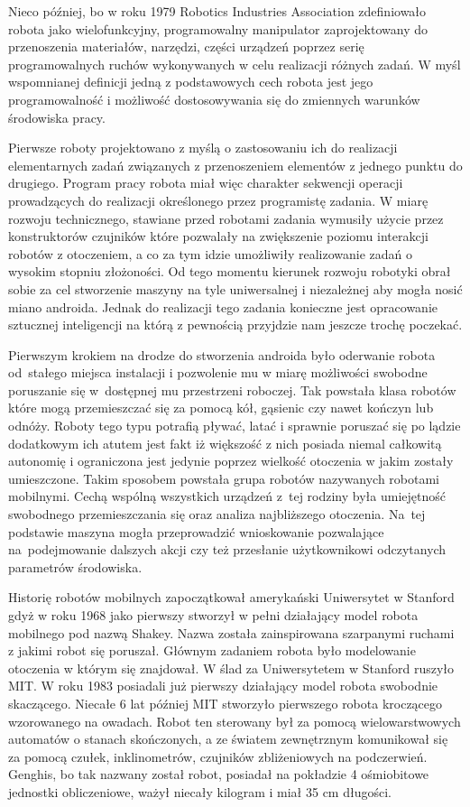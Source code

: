 Nieco później, bo w roku 1979 Robotics Industries Association 
zdefiniowało robota jako wielofunkcyjny, programowalny manipulator
zaprojektowany do przenoszenia materiałów, narzędzi, części urządzeń poprzez
serię programowalnych ruchów wykonywanych w celu realizacji różnych zadań.
W myśl wspomnianej definicji jedną z podstawowych cech robota jest jego
programowalność i możliwość dostosowywania się do zmiennych warunków środowiska
pracy. 

Pierwsze roboty projektowano z myślą o zastosowaniu ich do realizacji
elementarnych zadań związanych z przenoszeniem elementów z jednego punktu do
drugiego. Program pracy robota miał więc charakter sekwencji operacji
prowadzących do realizacji określonego przez programistę zadania. W miarę
rozwoju technicznego, stawiane przed robotami zadania wymusiły użycie przez
konstruktorów czujników które pozwalały na zwiększenie poziomu interakcji
robotów z otoczeniem, a co za tym idzie umożliwiły realizowanie zadań o wysokim
stopniu złożoności. Od tego momentu kierunek rozwoju robotyki obrał
sobie za cel stworzenie maszyny na tyle uniwersalnej i niezależnej aby mogła
nosić miano androida. Jednak do realizacji tego zadania konieczne jest
opracowanie sztucznej inteligencji na którą z pewnością przyjdzie nam jeszcze
trochę poczekać. 

Pierwszym krokiem na drodze do stworzenia androida było oderwanie robota
od~stałego miejsca instalacji i pozwolenie mu w miarę możliwości swobodne
poruszanie się w~dostępnej mu przestrzeni roboczej. Tak powstała klasa robotów
które mogą przemieszczać się za pomocą kół, gąsienic czy nawet kończyn lub
odnóży. Roboty tego typu potrafią pływać, latać i sprawnie poruszać się po lądzie
dodatkowym ich atutem jest fakt iż większość z nich posiada niemal całkowitą
autonomię i ograniczona jest jedynie poprzez wielkość otoczenia w jakim zostały
umieszczone. Takim sposobem powstała grupa robotów nazywanych robotami mobilnymi.
Cechą wspólną wszystkich urządzeń z~tej rodziny była umiejętność swobodnego
przemieszczania się oraz analiza najbliższego otoczenia. Na~tej podstawie maszyna
mogła przeprowadzić wnioskowanie pozwalające na~podejmowanie dalszych akcji czy
też przesłanie użytkownikowi odczytanych parametrów środowiska.

Historię robotów mobilnych zapoczątkował amerykański Uniwersytet w Stanford gdyż
w roku 1968 jako pierwszy stworzył w pełni działający model robota mobilnego pod
nazwą Shakey. Nazwa została zainspirowana szarpanymi ruchami z jakimi robot się
poruszał. Głównym zadaniem robota było modelowanie otoczenia w którym się
znajdował. W ślad za Uniwersytetem w Stanford ruszyło MIT. W roku 1983 posiadali
już pierwszy działający model robota swobodnie skaczącego. Niecałe 6
lat później MIT stworzyło pierwszego robota kroczącego wzorowanego na owadach.
Robot ten sterowany był za pomocą wielowarstwowych automatów o stanach
skończonych, a ze światem zewnętrznym komunikował się za pomocą czułek,
inklinometrów, czujników zbliżeniowych na podczerwień. Genghis, bo tak
nazwany został robot, posiadał na pokładzie 4 ośmiobitowe jednostki obliczeniowe, ważył
niecały kilogram i miał 35 cm długości.


